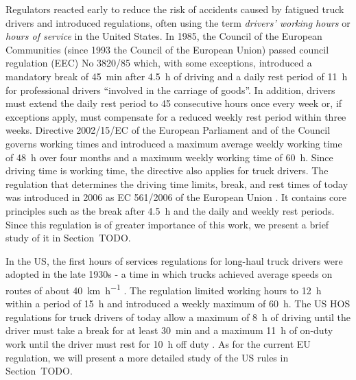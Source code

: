 Regulators reacted early to reduce the risk of accidents caused by fatigued truck drivers and introduced regulations, often using the term \emph{drivers' working hours} or \emph{hours of service} in the United States. In 1985, the Council of the European Communities (since 1993 the Council of the European Union) passed council regulation (EEC) No 3820/85 \cite{counciloftheeuropeancommunities:1985} which, with some exceptions, introduced a mandatory break of \SI{45}{\minute} after \SI{4.5}{\hour} of driving and a daily rest period of \SI{11}{\hour} for professional drivers ``involved in the carriage of goods''. In addition, drivers must extend the daily rest period to \si{45} consecutive hours once every week or, if exceptions apply, must compensate for a reduced weekly rest period within three weeks. Directive 2002/15/EC \cite{europeanparliament:2002} of the European Parliament and of the Council governs working times and introduced a maximum average weekly working time of \SI{48}{\hour} over four months and a maximum weekly working time of \SI{60}{\hour}. Since driving time is working time, the directive also applies for truck drivers. The regulation that determines the driving time limits, break, and rest times of today was introduced in 2006 as EC 561/2006 of the European Union \cite{europeanparliament:2006}. It contains core principles such as the break after \SI{4.5}{\hour} and the daily and weekly rest periods. Since this regulation is of greater importance of this work, we present a brief study of it in Section~TODO.

In the US, the first hours of services regulations for long-haul truck drivers were adopted in the late 1930s - a time in which trucks achieved average speeds on routes of about \SI[per-mode = symbol]{40}{\km\per\hour} \cite{federalmotorcarriersafetyadministrationfmcsa:2000}. The regulation limited working hours to \SI{12}{\hour} within a period of \SI{15}{\hour} and introduced a weekly maximum of \SI{60}{\hour}. The US HOS regulations for truck drivers of today allow a maximum of \SI{8}{\hour} of driving until the driver must take a break for at least \SI{30}{\minute} and a maximum \SI{11}{\hour} of on-duty work until the driver must rest for \SI{10}{\hour} off duty \cite{federalmotorcarriersafetyadministrationfmcsa:2011}. As for the current EU regulation, we will present a more detailed study of the US rules in Section~TODO.

